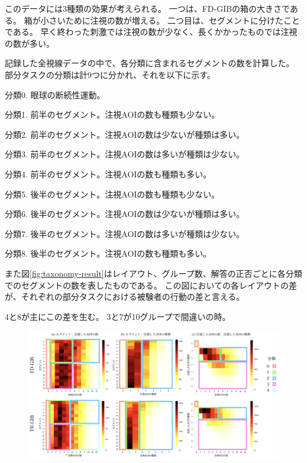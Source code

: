 \documentclass{kuee}
\begin{document}
このデータには3種類の効果が考えられる。
一つは、FD-GIBの箱の大きさである。
箱が小さいために注視の数が増える。
二つ目は、セグメントに分けたことである。
早く終わった刺激では注視の数が少なく、長くかかったものでは注視の数が多い。

記録した全視線データの中で、各分類に含まれるセグメントの数を計算した。
部分タスクの分類は計9つに分かれ、それを以下に示す。
\begin{description}
  \item{分類0.} 眼球の断続性運動。
  \item{分類1.} 前半のセグメント。注視AOIの数も種類も少ない。
  \item{分類2.} 前半のセグメント。注視AOIの数は少ないが種類は多い。
  \item{分類3.} 前半のセグメント。注視AOIの数は多いが種類は少ない。
  \item{分類4.} 前半のセグメント。注視AOIの数も種類も多い。
  \item{分類5.} 後半のセグメント。注視AOIの数も種類も少ない。
  \item{分類6.} 後半のセグメント。注視AOIの数は少ないが種類は多い。
  \item{分類7.} 後半のセグメント。注視AOIの数は多いが種類は少ない。
  \item{分類8.} 後半のセグメント。注視AOIの数も種類も多い。
\end{description}
また図\ref{fig:taxonomy-result}はレイアウト、グループ数、解答の正否ごとに各分類でのセグメントの数を表したものである。
この図においての各レイアウトの差が、それぞれの部分タスクにおける被験者の行動の差と言える。

4と8が主にこの差を生む。
3と7が10グループで間違いの時。




\begin{figure}[t]
  \begin{center}
  \includegraphics[width=15cm]{./images/taxonomy.png}
  \caption{}
  \label{fig:taxonomy}
  \end{center}
\end{figure}
\end{document}
